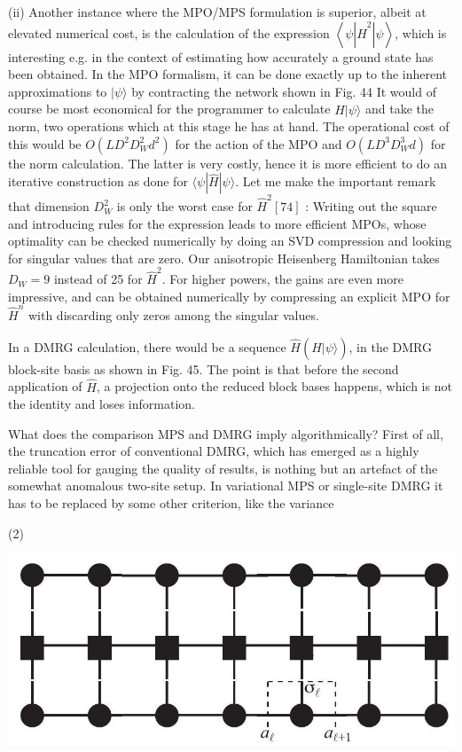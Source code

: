 \documentclass[12pt]{article}
\begin{document}
(ii) Another instance where the MPO/MPS formulation is superior, albeit at elevated numerical cost, is the calculation of the expression $\left\langle\psi\left|\hat{H}^{2}\right| \psi\right\rangle$, which is interesting e.g. in the context of estimating how accurately a ground state has been obtained. In the MPO formalism, it can be done exactly up to the inherent approximations to $|\psi\rangle$ by contracting the network shown in Fig. 44 It would of course be most economical for the programmer to calculate $\hat{H}|\psi\rangle$ and take the norm, two operations which at this stage he has at hand. The operational cost of this would be $O\left(L D^{2} D_{W}^{2} d^{2}\right)$ for the action of the MPO and $O\left(L D^{3} D_{W}^{3} d\right)$ for the norm calculation. The latter is very costly, hence it is more efficient to do an iterative construction as done for $\langle\psi|\hat{H}| \psi\rangle$. Let me make the important remark that dimension $D_{W}^{2}$ is only the worst case for $\hat{H}^{2}[74]$ : Writing out the square and introducing rules for the expression leads to more efficient MPOs, whose optimality can be checked numerically by doing an SVD compression and looking for singular values that are zero. Our anisotropic Heisenberg Hamiltonian takes $D_{W}=9$ instead of 25 for $\hat{H}^{2}$. For higher powers, the gains are even more impressive, and can be obtained numerically by compressing an explicit MPO for $\hat{H}^{n}$ with discarding only zeros among the singular values.

In a DMRG calculation, there would be a sequence $\hat{H}(\hat{H}|\psi\rangle)$, in the DMRG block-site basis as shown in Fig. 45. The point is that before the second application of $\hat{H}$, a projection onto the reduced block bases happens, which is not the identity and loses information.

What does the comparison MPS and DMRG imply algorithmically? First of all, the truncation error of conventional DMRG, which has emerged as a highly reliable tool for gauging the quality of results, is nothing but an artefact of the somewhat anomalous two-site setup. In variational MPS or single-site DMRG it has to be replaced by some other criterion, like the variance

(2)

\begin{center}
\includegraphics[max width=\textwidth]{2024_05_04_afc4ad226da9ccfe0ac8g-075(1)}
\end{center}
\end{document}
